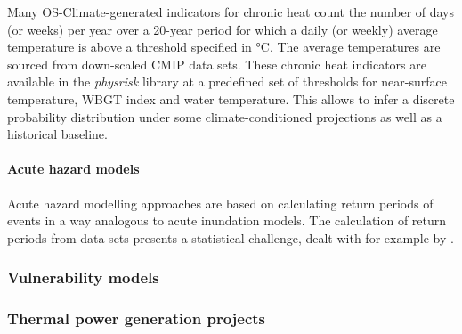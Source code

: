 \documentclass[a4paper,11pt]{extarticle} %
\theoremstyle{definition}
\begin{document}
Many OS-Climate-generated indicators for chronic heat count the number of days (or weeks) per year over a 20-year period for which a daily (or weekly) average temperature is above a threshold specified in °C. The average temperatures are sourced from down-scaled \gls{CMIP} data sets. These chronic heat indicators are available in the \emph{physrisk} library at a predefined set of thresholds for near-surface temperature, WBGT index and water temperature. This allows to infer a discrete probability distribution under some climate-conditioned projections as well as a historical baseline.

\paragraph{Acute hazard models}
Acute hazard modelling approaches are based on calculating return periods of events in a way analogous to acute inundation models. The calculation of return periods from data sets presents a statistical challenge, dealt with for example by \cite{MentaschiEtAl:2016}.

\subsubsection{Vulnerability models}

\setcounter{secnumdepth}{4}
\subsubsection{Thermal power generation projects}
\end{document}
